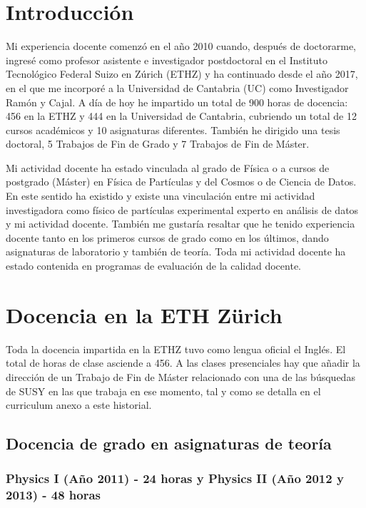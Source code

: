 \section{Introducción}

Mi experiencia docente comenzó en el año 2010 cuando, después de doctorarme, ingresé como profesor asistente e investigador postdoctoral en el Instituto Tecnológico Federal Suizo en Zúrich (ETHZ) y ha continuado desde el año 2017, en el que me incorporé a la Universidad de Cantabria (UC) como Investigador Ramón y Cajal. A día de hoy he impartido un total de 900 horas de docencia: 456 en la ETHZ y 444 en la
Universidad de Cantabria, cubriendo un total de 12 cursos académicos y 10 asignaturas diferentes. También he dirigido una tesis doctoral, 5 Trabajos de Fin de Grado y 7 Trabajos de Fin de Máster. 

Mi actividad docente ha estado vinculada al grado de Física o a cursos de postgrado (Máster) en Física de Partículas y del Cosmos o de Ciencia de Datos. En este sentido ha existido y existe una vinculación entre mi actividad investigadora como físico de partículas experimental experto en análisis de datos y mi actividad docente. También me gustaría resaltar que he tenido experiencia docente tanto en los primeros cursos de grado como en los últimos, dando asignaturas de laboratorio y también de teoría. Toda mi actividad docente ha estado contenida en programas de evaluación de la calidad docente.

\section{Docencia en la ETH Zürich}

Toda la docencia impartida en la ETHZ tuvo como lengua oficial el Inglés. El total de horas de clase asciende a 456. A las clases presenciales hay que añadir la dirección de un Trabajo de Fin de Máster relacionado con una de las búsquedas de SUSY en las que trabaja en ese momento, tal y como se detalla en el curriculum anexo a este historial. 

\subsection{Docencia de grado en asignaturas de teoría}  

\subsubsection{Physics I (Año 2011) - 24 horas y Physics II (Año 2012 y 2013) - 48 horas}


